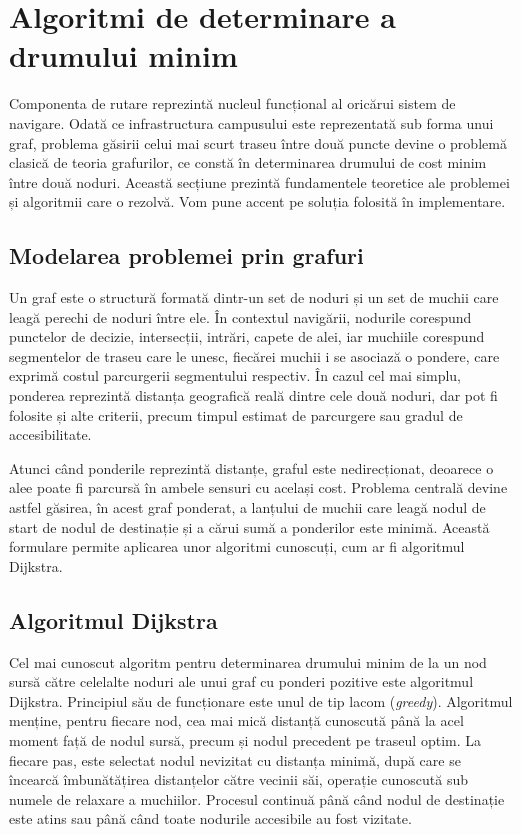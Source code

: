\section{Algoritmi de determinare a drumului minim}
\label{sec:algoritmi-rutare}

Componenta de rutare reprezintă nucleul funcțional al oricărui sistem de
navigare. Odată ce infrastructura campusului este reprezentată sub forma unui
graf, problema găsirii celui mai scurt traseu între două puncte devine o
problemă clasică de teoria grafurilor, ce constă în determinarea drumului de cost minim între
două noduri. Această secțiune prezintă fundamentele teoretice ale problemei și
algoritmii care o rezolvă. Vom pune accent pe soluția folosită în implementare.

\subsection{Modelarea problemei prin grafuri}
\label{subsec:graf-teoretic}

Un graf este o structură formată dintr-un set de noduri și un set de muchii care
leagă perechi de noduri între ele. În contextul navigării, nodurile corespund punctelor de
decizie, intersecții, intrări, capete de alei, iar muchiile corespund
segmentelor de traseu care le unesc, fiecărei muchii i se asociază o pondere,
care exprimă costul parcurgerii segmentului respectiv. În cazul cel mai simplu,
ponderea reprezintă distanța geografică reală dintre cele două noduri, dar pot fi
folosite și alte criterii, precum timpul estimat de parcurgere sau gradul de
accesibilitate.

Atunci când ponderile reprezintă distanțe, graful este nedirecționat, deoarece o
alee poate fi parcursă în ambele sensuri cu același cost. Problema centrală
devine astfel găsirea, în acest graf ponderat, a lanțului de muchii care leagă
nodul de start de nodul de destinație și a cărui sumă a ponderilor este minimă.
Această formulare permite aplicarea unor algoritmi cunoscuți, cum ar fi algoritmul
Dijkstra\cite{Madkour2017}. 

\subsection{Algoritmul Dijkstra}
\label{subsec:dijkstra-teoretic}

Cel mai cunoscut algoritm pentru determinarea drumului minim de la un nod sursă
către celelalte noduri ale unui graf cu ponderi pozitive este algoritmul
Dijkstra. Principiul său de funcționare este unul de tip lacom (\textit{greedy}).
Algoritmul menține, pentru fiecare nod, cea mai mică distanță cunoscută până la
acel moment față de nodul sursă, precum și nodul precedent pe traseul optim. La
fiecare pas, este selectat nodul nevizitat cu distanța minimă, după care se
încearcă îmbunătățirea distanțelor către vecinii săi, operație cunoscută sub
numele de relaxare a muchiilor. Procesul continuă până când nodul de destinație
este atins sau până când toate nodurile accesibile au fost vizitate.

